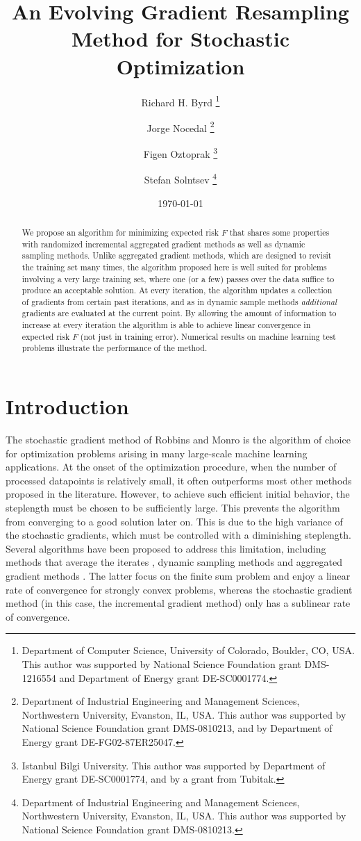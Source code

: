 \documentclass[11pt]{article}
\title{An Evolving Gradient Resampling Method for Stochastic Optimization}
\author{Richard H. Byrd 
\thanks{Department of Computer Science, University of Colorado, Boulder, CO, USA. This author was supported by National Science Foundation grant DMS-1216554 and Department of Energy grant DE-SC0001774.} 
\and Jorge Nocedal 
\thanks{Department of Industrial Engineering and Management Sciences, Northwestern University, Evanston, IL, USA. This author was supported by National Science Foundation grant DMS-0810213, and by Department of Energy grant DE-FG02-87ER25047.} 
\and Figen Oztoprak 
\thanks{Istanbul Bilgi University. This author was supported by Department of Energy grant DE-SC0001774, and by a grant from Tubitak.} 
\and Stefan Solntsev \thanks{Department of Industrial Engineering and Management Sciences, Northwestern University, Evanston, IL, USA. This author was supported by National Science Foundation grant DMS-0810213.} 
}
\date{\today}
\begin{document}
\maketitle 
\begin{abstract}
We propose an algorithm for minimizing expected risk $F$ that shares some properties with randomized  incremental aggregated gradient methods as well as  dynamic sampling methods. Unlike aggregated gradient methods, which are designed to revisit the training set many times, the algorithm proposed here is well suited for problems involving a very large training set,  where one (or a few) passes over the data suffice to produce an acceptable solution.  At every iteration, the algorithm updates  a collection of gradients  from certain past iterations, and as in dynamic sample methods \emph{additional} gradients are evaluated at the current point. By allowing the amount of information to increase at every iteration the algorithm is able to achieve  linear convergence in expected risk $F$ (not just in training error). Numerical results on machine learning test problems illustrate the performance of the method. 
\end{abstract}
 
%

\section{Introduction}

The stochastic gradient method of Robbins and Monro \cite{RobMon51} is the algorithm of choice for optimization problems arising in many large-scale machine learning applications.  At the onset of the optimization procedure, when the number of processed datapoints is relatively small, it often outperforms most other methods proposed in the literature. However, to achieve such efficient initial behavior, the steplength must be chosen to be sufficiently large. This prevents the algorithm from converging to a good solution later on. This is due to the high variance of the stochastic gradients, which must be controlled with a diminishing steplength. Several algorithms have been proposed to address this limitation, including methods that average the iterates \cite{PolJud92,ruppert1988efficient, Nesterov:09}, dynamic sampling methods \cite{dss,FS2011,2014pasglyetal} and aggregated gradient methods  \cite{roux2012stochastic,johnson2013accelerating,shalev2013stochastic,mairal2015incremental,defazio2014finito,
frostig2014competing,NIPS2014_5258}.
The latter focus on the finite sum problem and enjoy a linear rate of convergence for strongly convex problems, whereas the stochastic gradient method (in this case, the incremental gradient method) only has a sublinear rate of convergence.  
\end{document}
